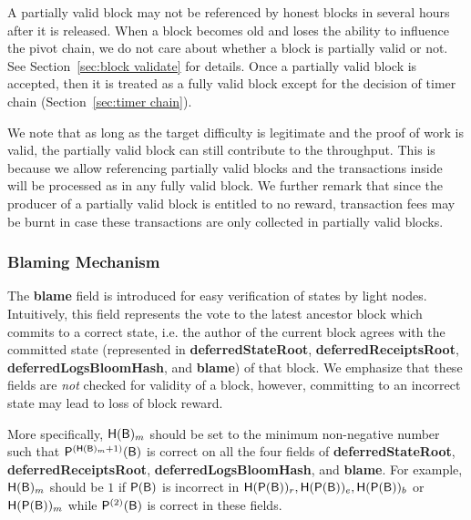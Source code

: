 A partially valid block may not be referenced by honest blocks in several hours after it is released. 
When a block becomes old and loses the ability to influence the pivot chain, we do not care about whether a block is partially valid or not. See Section~\ref{sec:block validate} for details. 
Once a partially valid block is accepted, then it is treated as a fully valid block except for the decision of timer chain (Section~\ref{sec:timer chain}).


We note that as long as the target difficulty is legitimate and the proof of work is valid,
the partially valid block can still contribute to the throughput.
This is because we allow referencing partially valid blocks and the transactions inside will be processed as in any fully valid block.
% 
We further remark that since the producer of a partially valid block is entitled to no reward, transaction fees may be burnt in case these transactions are only collected in partially valid blocks.







\subsubsection{Blaming Mechanism}
\label{sec:blaming}
	
	The {\bf blame} field is introduced for easy verification of states by light nodes.
	Intuitively, this field represents the vote to the latest ancestor block which commits to a correct state, 
	i.e. the author of the current block agrees with the committed state (represented in {\bf deferredStateRoot}, {\bf deferredReceiptsRoot}, {\bf deferredLogsBloomHash}, and {\bf blame}) of that block.
	We emphasize that these fields are \emph{not} checked for validity of a block, however, committing to an incorrect state may lead to loss of block reward.



	More specifically, $\textsf{H}(\textsf{B})_{m}$ should be set to the minimum non-negative number such that $\mathsf{P}^{\left(\textsf{H}(\textsf{B})_{m}+1\right)}(\textsf{B})$ is correct on all the four fields of {\bf deferredStateRoot}, {\bf deferredReceiptsRoot}, {\bf deferredLogsBloomHash}, and {\bf blame}.
	For example, $\textsf{H}(\textsf{B})_{m}$ should be $1$ if $\mathsf{P}{\left({\textsf{B}} \right)}$ is incorrect in $\textsf{H}(\mathsf{P}{\left({\textsf{B}} \right)})_{r}, \textsf{H}(\mathsf{P}{\left({\textsf{B}} \right)})_{e}, \textsf{H}(\mathsf{P}{\left({\textsf{B}} \right)})_{b}$ or $\textsf{H}(\mathsf{P}{\left({\textsf{B}} \right)})_{m}$ while $\mathsf{P}^{(2)}(\textsf{B})$ is correct in these fields.

